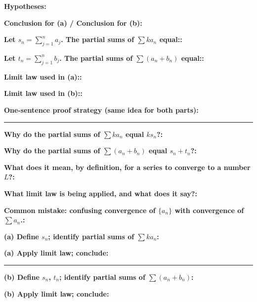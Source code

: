 \documentclass[12pt]{article}
\newcommand{\fillfield}[1]{%
  \par\noindent\textbf{#1:}\enspace\hrulefill\par\vspace{3pt}%
}
\newcommand{\fillfieldlong}[1]{%
  \par\noindent\textbf{#1:}\par\vspace{1.5cm}%
  \noindent\rule{\linewidth}{0.35pt}\par\vspace{4pt}%
}
\newcommand{\writespace}[1]{\vspace{#1}}
\begin{document}
\bigskip

\begin{tcolorbox}[
  enhanced, breakable,
  colback  = pass2yellow,
  colframe = yellow!65!black,
  fonttitle = \bfseries,
  title = {Pass 2 \enspace\textbf{--}\enspace Proof Recipe Card}
]
\fillfield{Hypotheses}
\fillfield{Conclusion for (a) / Conclusion for (b)}
\fillfield{Let $s_n = \sum_{j=1}^n a_j$. The partial sums of $\sum ka_n$ equal:}
\fillfield{Let $t_n = \sum_{j=1}^n b_j$. The partial sums of $\sum(a_n+b_n)$ equal:}
\fillfield{Limit law used in (a):}
\fillfield{Limit law used in (b):}
\fillfieldlong{One-sentence proof strategy (same idea for both parts)}
\end{tcolorbox}

\bigskip

\begin{tcolorbox}[
  enhanced, breakable,
  colback  = pass3orange,
  colframe = orange!65!black,
  fonttitle = \bfseries,
  title = {Pass 3 \enspace\textbf{--}\enspace Self-Explanation}
]
\fillfield{Why do the partial sums of $\sum ka_n$ equal $ks_n$?}
\fillfield{Why do the partial sums of $\sum(a_n+b_n)$ equal $s_n + t_n$?}
\fillfield{What does it mean, by definition, for a series to converge to a number $L$?}
\fillfield{What limit law is being applied, and what does it say?}
\fillfield{Common mistake: confusing convergence of $\{a_n\}$ with convergence of $\sum a_n$.}
\end{tcolorbox}

\newpage

\begin{tcolorbox}[
  enhanced, breakable,
  colback  = pass4purple,
  colframe = purple!55!black,
  fonttitle = \bfseries,
  title = {Pass 4 \enspace\textbf{--}\enspace Skeleton Proof}
]
\noindent\textbf{(a) Define $s_n$; identify partial sums of $\sum ka_n$:}\par
\writespace{1.6cm}

\noindent\textbf{(a) Apply limit law; conclude:}\par
\writespace{1.6cm}

\noindent\rule{\linewidth}{0.4pt}\vspace{2pt}

\noindent\textbf{(b) Define $s_n$, $t_n$; identify partial sums of $\sum(a_n+b_n)$:}\par
\writespace{1.6cm}

\noindent\textbf{(b) Apply limit law; conclude:}\par
\writespace{1.6cm}
\end{tcolorbox}
\end{document}
